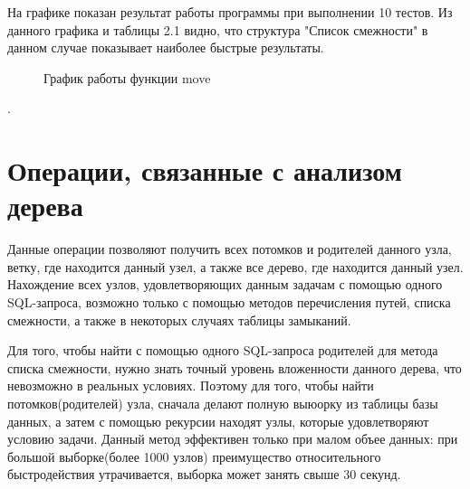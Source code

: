 \documentclass[a4paper,14pt]{extreport}
\theoremstyle{definition}
\begin{document}
На графике показан результат работы программы при выполнении 10 тестов. Из данного графика и таблицы 2.1 видно, что структура "Список смежности" в данном случае показывает наиболее быстрые результаты.
\begin{figure}
\caption{График работы функции move}
\label{fig:3}
\end{figure}.

\section{Операции, связанные с анализом дерева}
Данные операции позволяют получить всех потомков и родителей данного узла, ветку, где находится данный узел, а также все дерево, где находится данный узел. Нахождение всех узлов, удовлетворяющих данным задачам с помощью одного SQL-запроса, возможно только с помощью методов перечисления путей, списка смежности, а также в некоторых случаях таблицы замыканий.

Для того, чтобы найти с помощью одного SQL-запроса родителей для метода списка смежности, нужно знать точный уровень вложенности данного дерева, что невозможно в реальных условиях. Поэтому для того, чтобы найти потомков(родителей) узла, сначала делают полную выюорку из таблицы базы данных, а затем с помощью рекурсии находят узлы, которые удовлетворяют условию задачи. Данный метод эффективен только при малом объее данных: при большой выборке(более 1000 узлов) преимущество относительного быстродействия утрачивается, выборка может занять свыше 30 секунд.
\end{document}
